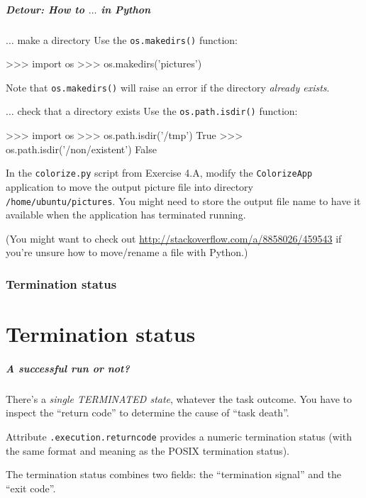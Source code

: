\documentclass[english,serif,mathserif,xcolor=pdftex,dvipsnames,table]{beamer}
\begin{document}
\begin{frame}[fragile]
  \frametitle{Detour: How to $\ldots$ in Python}
  \small{}

  \begin{describe}{$\ldots$ make a directory}
    Use the \lstinline|os.makedirs()| function:
    \begin{python}
>>> import os
>>> os.makedirs('pictures')
   \end{python}
   Note that \lstinline|os.makedirs()| will raise an error if the directory
   \emph{already exists}.
  \end{describe}

  \begin{describe}{$\ldots$ check that a directory exists}
    Use the \lstinline|os.path.isdir()| function:
    \begin{python}
>>> import os
>>> os.path.isdir('/tmp')
True
>>> os.path.isdir('/non/existent')
False
    \end{python}
  \end{describe}
\end{frame}


\begin{frame}
  \begin{exercise*}[6.A]

    In the \texttt{colorize.py} script from Exercise 4.A, modify the
    \texttt{ColorizeApp} application to move the output picture file
    into directory \texttt{/home/ubuntu/pictures}.  You might need to
    store the output file name to have it available when the
    application has terminated running.

    \+
    (You might want to check out
    \url{http://stackoverflow.com/a/8858026/459543} if you're unsure
    how to move/rename a file with Python.)
  \end{exercise*}
\end{frame}


\section{Termination status}
\part{Termination status}

\begin{frame}[fragile]
  \frametitle{A successful run or not?}

  There's a \emph{single TERMINATED state}, whatever the task outcome.
  You have to inspect the ``return code'' to determine the
  cause of ``task death''.

  \+
  Attribute \lstinline|.execution.returncode| provides a numeric termination
  status (with the same format and meaning as the POSIX termination
  status).

  \+
  The termination status combines two fields: the ``termination
  signal'' and the ``exit code''.

\end{frame}
\end{document}
